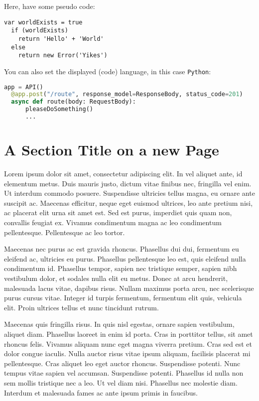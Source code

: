 \bigskip
Here, have some pseudo code:

\begin{lstlisting}[caption={Basic structure of Hello World}, label={lst:basicHello}]
  var worldExists = true 
  if (worldExists)
    return 'Hello' + 'World'
  else
    return new Error('Yikes')
\end{lstlisting}

\clearpage
You can also set the displayed (code) language, in this case \verb|Python|:

\begin{lstlisting}[caption={This is Python code from main.py}, label={lst:mainFunc}, language=Python]
  app = API()
  @app.post("/route", response_model=ResponseBody, status_code=201)
  async def route(body: RequestBody):
      pleaseDoSomething()
      ...
\end{lstlisting}

\clearpage
\section{A Section Title on a new Page}

Lorem ipsum dolor sit amet, consectetur adipiscing elit. In vel aliquet ante, id elementum metus. Duis mauris justo, dictum vitae finibus nec, fringilla vel enim. Ut interdum commodo posuere. Suspendisse ultricies tellus magna, eu ornare ante suscipit ac. Maecenas efficitur, neque eget euismod ultrices, leo ante pretium nisi, ac placerat elit urna sit amet est. Sed est purus, imperdiet quis quam non, convallis feugiat ex. Vivamus condimentum magna ac leo condimentum pellentesque. Pellentesque ac leo tortor.

Maecenas nec purus ac est gravida rhoncus. Phasellus dui dui, fermentum eu eleifend ac, ultricies eu purus. Phasellus pellentesque leo est, quis eleifend nulla condimentum id. Phasellus tempor, sapien nec tristique semper, sapien nibh vestibulum dolor, et sodales nulla elit eu metus. Donec at arcu hendrerit, malesuada lacus vitae, dapibus risus. Nullam maximus porta arcu, nec scelerisque purus cursus vitae. Integer id turpis fermentum, fermentum elit quis, vehicula elit. Proin ultrices tellus et nunc tincidunt rutrum.

Maecenas quis fringilla risus. In quis nisl egestas, ornare sapien vestibulum, aliquet diam. Phasellus laoreet in enim id porta. Cras in porttitor tellus, sit amet rhoncus felis. Vivamus aliquam nunc eget magna viverra pretium. Cras sed est et dolor congue iaculis. Nulla auctor risus vitae ipsum aliquam, facilisis placerat mi pellentesque. Cras aliquet leo eget auctor rhoncus. Suspendisse potenti. Nunc tempus vitae sapien vel accumsan. Suspendisse potenti. Phasellus id nulla non sem mollis tristique nec a leo. Ut vel diam nisi. Phasellus nec molestie diam. Interdum et malesuada fames ac ante ipsum primis in faucibus.

